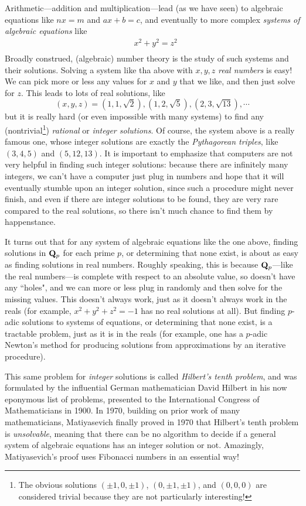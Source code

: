 \documentclass[11pt,oneside]{amsart}
\begin{document}
Arithmetic---addition and multiplication---lead (as we have seen) to 
algebraic equations like $nx=m$ and $ax+b=c$, and eventually to more complex {\em systems of algebraic equations}
like
\begin{align*}
	&x^2 + y^2 = z^2\\
\end{align*}
Broadly construed, (algebraic) number theory is the study of such systems and their solutions.  
Solving a system like tha above with $x,y,z$ {\em real numbers} is easy!  We can pick more or less
any values for $x$ and $y$ that we like, and then just solve for $z$.  This leads to lots of real solutions, like
$$
(x,y,z) = (1,1,\sqrt{2}), (1,2,\sqrt{5}), (2,3,\sqrt{13}),\cdots
$$
but it is really hard (or even impossible with many systems) to find any (nontrivial\footnote{The obvious solutions 
$(\pm1,0,\pm1)$, $(0,\pm 1, \pm 1)$, and $(0,0,0)$ are considered trivial because they are not particularly interesting!
}) {\em rational} or {\em integer solutions}.
Of course, the system above is a really famous one, whose integer solutions are exactly the {\em Pythagorean triples},
like $(3,4,5)$ and $(5,12,13)$.  It is important to emphasize that computers are not very helpful in finding such integer solutions:
because there are infinitely many integers, we can't have a computer just plug in numbers and hope that it will eventually stumble upon an integer solution,
since such a procedure might never finish, and even if there are integer solutions to be found, they are very rare compared to the real solutions,
so there isn't much chance to find them by happenstance.  

It turns out that for any system of algebraic equations like the one above, 
finding solutions in $\mathbf{Q}_p$ for each prime $p$, or determining that none exist, 
is about as easy as finding solutions in real numbers.  Roughly speaking, this is because $\mathbf{Q}_p$---like the real numbers---is complete
with respect to an absolute value, so doesn't have any ``holes", and we can more or less plug in randomly and then solve for the missing values.
This doesn't always work, just as it doesn't always work in the reals (for example, $x^2+y^2+z^2 = -1$ has no real solutions at all).
But finding $p$-adic solutions to systems of equations, or determining that none exist, is a tractable problem,
just as it is in the reals (for example, one has a $p$-adic Newton's method for producing solutions from approximations by an iterative procedure).

This same problem for {\em integer} solutions is called {\em Hilbert's tenth problem}, and was formulated by the influential 
German mathematician David Hilbert in his now eponymous list of problems, presented to the International Congress of Mathematicians in 1900.
In 1970, building on prior work of many mathematicians, Matiyasevich finally proved in 1970 that Hilbert's tenth problem is {\em unsolvable},
meaning that there can be no algorithm to decide if a general system of algebraic equations has an integer solution or not.
Amazingly, Matiyasevich's proof uses Fibonacci numbers in an essential way!
\end{document}
